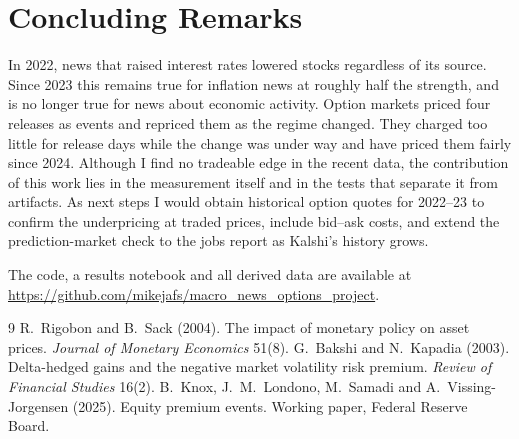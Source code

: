 \documentclass[10pt]{article}
\begin{document}
\section{Concluding Remarks}
In 2022, news that raised interest rates lowered stocks regardless of its source. Since 2023 this remains true for inflation news at roughly half the strength, and is no longer true for news about economic activity. Option markets priced four releases as events and repriced them as the regime changed. They charged too little for release days while the change was under way and have priced them fairly since 2024. Although I find no tradeable edge in the recent data, the contribution of this work lies in the measurement itself and in the tests that separate it from artifacts. As next steps I would obtain historical option quotes for 2022--23 to confirm the underpricing at traded prices, include bid--ask costs, and extend the prediction-market check to the jobs report as Kalshi's history grows.

\medskip\noindent The code, a results notebook and all derived data are available at \url{https://github.com/mikejafs/macro_news_options_project}.

\begin{thebibliography}{9}\small
{} R.~Rigobon and B.~Sack (2004). The impact of monetary policy on asset prices. \emph{Journal of Monetary Economics} 51(8).
 G.~Bakshi and N.~Kapadia (2003). Delta-hedged gains and the negative market volatility risk premium. \emph{Review of Financial Studies} 16(2).
 B.~Knox, J.~M.~Londono, M.~Samadi and A.~Vissing-Jorgensen (2025). Equity premium events. Working paper, Federal Reserve Board.
\end{thebibliography}
\end{document}
